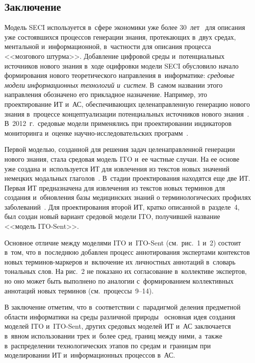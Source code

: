\begin{multicols}{2}
\section{Заключение}

  Модель SECI используется в~сфере экономики уже более 30~лет~\cite{9-zac} 
для описания уже состоявшихся процессов генерации знания, протекающих в~двух 
средах, ментальной и~информационной, в~част\-ности для описания процесса 
<<мозгового штурма>>. Добавление цифровой среды и~потенциальных 
источников нового знания в~ходе оцифровки модели SECI обусловило начало 
формирования нового теоретического направления в~информатике: 
\textit{средовые модели информационных технологий и~систем}. В~самом 
названии этого направления обозначено его прикладное назначение. Например, 
это проектирование ИТ и~АС, обеспечивающих целенаправленную генерацию нового знания 
в~процессе концептуализации потенциальных источников нового знания~\cite{5-zac, 
6-zac, 7-zac, 12-zac, 19-zac, 27-zac, 28-zac}. В~2012~г.\ средовые модели 
применялись при проектировании индикаторов мониторинга и~оценке на\-уч\-но-ис\-сле\-до\-ва\-тель\-ских программ~\cite{29-zac, 30-zac}.
  
  Первой моделью, созданной для решения задач целенаправленной генерации 
нового знания, стала средовая модель ITO и~ее частные случаи. На ее основе уже 
создана и~используется ИТ для извлечения из текстов новых значений немецких 
модальных глаголов~\cite{5-zac, 7-zac, 12-zac, 19-zac, 27-zac, 28-zac}. В~стадии 
проектирования находятся еще две ИТ. Первая ИТ предназначена для извлечения 
из текстов новых терминов для создания и~обновления базы медицинских знаний 
о терминологических профилях заболеваний~\cite{6-zac}. Для проектирования 
второй ИТ, кратко описанной в~разделе~4, был создан новый вариант средовой 
модели ITO, получившей название <<модель ITO-Sent>>.
  
  Основное отличие между моделями ITO и~ITO-Sent (см.\ рис.~1 и~2) состоит в~том, 
что в~последнюю добавлен процесс аннотирования экспертами контекстов новых 
терминов-маркеров и~включение их личностных аннотаций в~словарь тональных 
слов. На рис.~2 не показано их согласование в~коллективе экспертов, но оно 
может быть выполнено по аналогии с~формированием коллективных аннотаций 
новых терминов (см.\ процессы~9--14).
  
  В заключение отметим, что в~соответствии с~парадигмой деления предметной 
области информатики на среды различной природы~\cite{15-zac, 16-zac, 17-zac} 
основная идея создания моделей ITO и~ITO-Sent, других средовых моделей ИТ 
и~АС заключается в~явном использовании трех и~более сред, границ между ними, 
а~также в~распределении технологических этапов по средам и~границам при 
моделировании ИТ и~информационных процессов в~АС.
  

\end{multicols}
